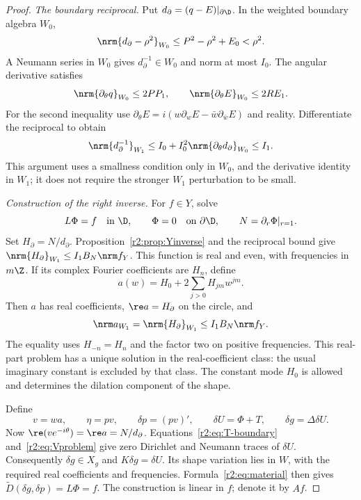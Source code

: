 \begin{proof}
\emph{The boundary reciprocal.}
Put $d_\partial=(q-E)|_{\partial\D}$. In the weighted boundary algebra $W_0$,
\[
 \nrm{d_\partial-\rho^2}_{W_0}
 \le P^2-\rho^2+E_0<\rho^2.
\]
A Neumann series in $W_0$ gives $d_\partial^{-1}\in W_0$ and norm at most $I_0$. The angular derivative satisfies
\[
 \nrm{\partial_\theta q}_{W_0}\le2PP_1,
 \qquad\nrm{\partial_\theta E}_{W_0}\le2RE_1.
\]
For the second inequality use $\partial_\theta E=i(w\partial_wE-\bar w\partial_{\bar w}E)$ and reality. Differentiate the reciprocal to obtain
\[
 \nrm{d_\partial^{-1}}_{W_1}
 \le I_0+I_0^2\nrm{\partial_\theta d_\partial}_{W_0}\le I_1.
\]
This argument uses a smallness condition only in $W_0$, and the derivative identity in $W_1$; it does not require the stronger $W_1$ perturbation to be small.

\emph{Construction of the right inverse.}
For $f\in Y$, solve
\begin{equation}\label{r2:eq:Vproblem}
 L\Phi=f\quad\text{in }\D,\qquad\Phi=0\quad\text{on }\partial\D,
 \qquad N=\partial_r\Phi|_{r=1}.
\end{equation}
Set $H_\partial=N/d_\partial$. Proposition~\ref{r2:prop:Yinverse} and the reciprocal bound give $\nrm{H_\partial}_{W_1}\le I_1B_N\nrm f_Y$. This function is real and even, with frequencies in $m\Z$. If its complex Fourier coefficients are $H_n$, define
\begin{equation}\label{r2:eq:realpart}
 a(w)=H_0+2\sum_{j>0}H_{jm}w^{jm}.
\end{equation}
Then $a$ has real coefficients, $\re a=H_\partial$ on the circle, and
\begin{equation}\label{r2:eq:a-norm}
 \nrm a_{W_1}=\nrm{H_\partial}_{W_1}\le I_1B_N\nrm f_Y.
\end{equation}
The equality uses $H_{-n}=H_n$ and the factor two on positive frequencies. This real-part problem has a unique solution in the real-coefficient class: the usual imaginary constant is excluded by that class. The constant mode $H_0$ is allowed and determines the dilation component of the shape.

Define
\begin{equation}\label{r2:eq:A-recipe}
 v=wa,\qquad\eta=pv,\qquad\delta p=(pv)',
 \qquad\delta U=\Phi+T,\qquad\delta g=\Delta\delta U.
\end{equation}
Now $\re(ve^{-i\theta})=\re a=N/d_\partial$. Equations~\eqref{r2:eq:T-boundary} and~\eqref{r2:eq:Vproblem} give zero Dirichlet and Neumann traces of $\delta U$. Consequently $\delta g\in X_g$ and $K\delta g=\delta U$. Its shape variation lies in $W$, with the required real coefficients and frequencies. Formula~\eqref{r2:eq:material} then gives $\widetilde D(\delta g,\delta p)=L\Phi=f$. The construction is linear in $f$; denote it by $Af$.


\end{proof}
